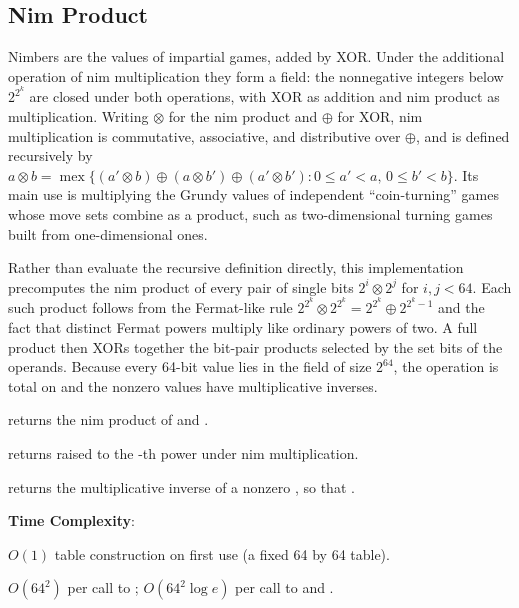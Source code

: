 \subsection{Nim Product}
\label{sec:6.8.2}
Nimbers are the values of impartial games, added by XOR. Under the additional operation of nim multiplication they form a field: the nonnegative integers below $2^{2^k}$ are closed under both operations, with XOR as addition and nim product as multiplication. Writing $\otimes$ for the nim product and $\oplus$ for XOR, nim multiplication is commutative, associative, and distributive over $\oplus$, and is defined recursively by $a \otimes b = \operatorname{mex}\{(a' \otimes b) \oplus (a \otimes b') \oplus (a' \otimes b') : 0 \le a' < a, \, 0 \le b' < b\}$. Its main use is multiplying the Grundy values of independent ``coin-turning'' games whose move sets combine as a product, such as two-dimensional turning games built from one-dimensional ones.

Rather than evaluate the recursive definition directly, this implementation precomputes the nim product of every pair of single bits $2^i \otimes 2^j$ for $i, j < 64$. Each such product follows from the Fermat-like rule $2^{2^k} \otimes 2^{2^k} = 2^{2^k} \oplus 2^{2^k - 1}$ and the fact that distinct Fermat powers multiply like ordinary powers of two. A full product then XORs together the bit-pair products selected by the set bits of the operands. Because every 64-bit value lies in the field of size $2^{64}$, the operation is total on  and the nonzero values have multiplicative inverses.

\begin{compactitem}
  \item {} returns the nim product of  and .
  \item {} returns  raised to the -th power under nim multiplication.
  \item {} returns the multiplicative inverse of a nonzero , so that .
\end{compactitem}

\textbf{Time Complexity}:
\begin{compactitem}
  \item $O(1)$ table construction on first use (a fixed 64 by 64 table).
  \item $O(64^{2})$ per call to ; $O(64^{2} \log e)$ per call to  and .
\end{compactitem}

